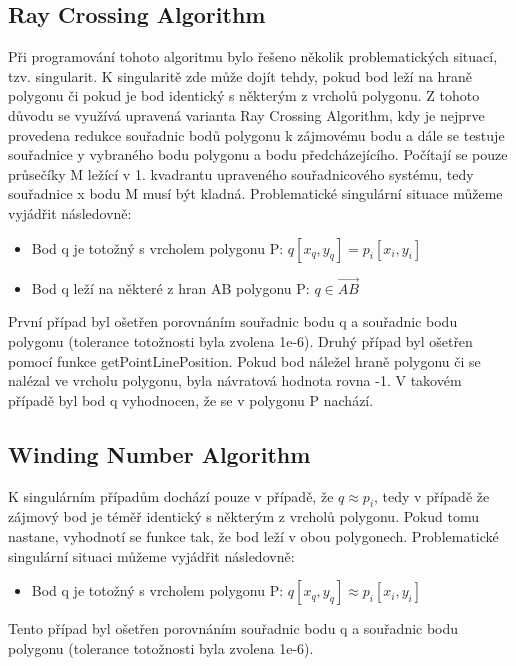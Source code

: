 \documentclass[a4paper,11pt,twoside]{article}
\begin{document}
\subsection{Ray Crossing Algorithm}
\large
Při programování tohoto algoritmu bylo řešeno několik problematických situací, tzv. singularit. K singularitě zde může dojít tehdy, pokud bod leží na hraně polygonu či pokud je bod identický s některým z vrcholů polygonu. Z tohoto důvodu se využívá upravená varianta Ray Crossing Algorithm, kdy je nejprve provedena redukce souřadnic bodů polygonu k zájmovému bodu a dále se testuje souřadnice y vybraného bodu polygonu a bodu předcházejícího. Počítají se pouze průsečíky M ležící v 1. kvadrantu upraveného souřadnicového systému, tedy souřadnice x bodu M musí být kladná. Problematické singulární situace můžeme vyjádřit následovně:
\begin{itemize}
\item Bod q je totožný s vrcholem polygonu P:  $  q [x_q, y_q] = p_i [x_i, y_i] $ 
\item Bod q leží na některé z hran AB polygonu P:   $  q \in \overrightarrow{AB} $ 
\end{itemize}

\noindent První případ byl ošetřen porovnáním souřadnic bodu q a souřadnic bodu polygonu (tolerance totožnosti byla zvolena 1e-6). Druhý případ byl ošetřen pomocí funkce getPointLinePosition. Pokud bod náležel hraně polygonu či se nalézal ve vrcholu polygonu, byla návratová hodnota rovna -1. V takovém případě byl bod q vyhodnocen, že se v polygonu P nachází.

\subsection{Winding Number Algorithm}
\large
K singulárním případům dochází pouze v případě, že $q \approx p_i$, tedy v případě že zájmový bod je téměř identický s některým z vrcholů polygonu. Pokud tomu nastane, vyhodnotí se funkce tak, že bod leží v obou polygonech. Problematické singulární situaci můžeme vyjádřit následovně:

\begin{itemize}
\item Bod q je totožný s vrcholem polygonu P:  $  q [x_q, y_q] \approx p_i [x_i, y_i] $ 
\end{itemize}

\noindent Tento případ byl ošetřen porovnáním souřadnic bodu q a souřadnic bodu polygonu (tolerance totožnosti byla zvolena 1e-6).
\end{document}

